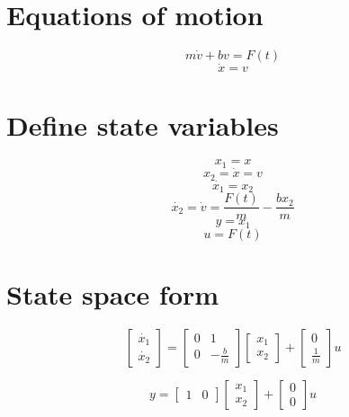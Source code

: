 \documentclass[12pt, letterpaper]{article}
\begin{document}
\section{Equations of motion}
\begin{equation} m \dot{v} + bv = F(t) \end{equation}
\begin{equation} \dot{x} = v \end{equation}

\section{Define state variables}
\begin{equation} x_{1} = x \end{equation}
\begin{equation} x_{2} = \dot{x} = v \end{equation}
\begin{equation} \dot{x_{1}} = x_{2} \end{equation}
\begin{equation} \dot{x_{2}} = \dot{v} = \frac{F(t)}{m} - \frac{bx_{2}}{m} \end{equation}
\begin{equation} y = x_{1} \end{equation}
\begin{equation} u = F(t)\end{equation}

\section{State space form}
\begin{equation}
\begin{bmatrix} \dot{x_{1}} \\ \dot{x_{2}} \end{bmatrix} 
= 
\begin{bmatrix} 0 & 1 \\ 0 & -\frac{b}{m} \end{bmatrix} 
\begin{bmatrix} x_{1}\\ x_{2} \end{bmatrix} 
+ 
\begin{bmatrix} 0\\ \frac{1}{m} \end{bmatrix}u
\end{equation}

\begin{equation} y = \begin{bmatrix} 1 & 0 \end{bmatrix} \begin{bmatrix} x_{1} \\ x_{2} \end{bmatrix} + \begin{bmatrix} 0 \\ 0 \end{bmatrix}u
\end{equation}
\end{document}
